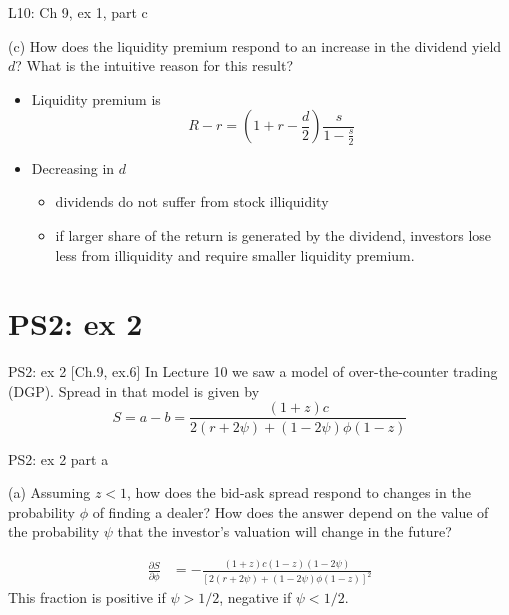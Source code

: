\documentclass[english,10pt
,aspectratio=169
]{beamer}
\begin{document}
\begin{frame}{L10: Ch 9, ex 1, part c}
	\begin{exampleblock}{}
		(c) How does the liquidity premium respond to an increase in the
		dividend yield $d$? What is the intuitive reason for this result?
	\end{exampleblock}
	
	\pause
	
	\begin{itemize}
		\item Liquidity premium is 
		\[ R-r = \left(1+r-\frac{d}{2}\right) \frac{s}{1-\frac{s}{2}} \]
		\item Decreasing in $d$
		\begin{itemize}
			\item dividends do not suffer from stock illiquidity
			\item if larger share of the return is generated by the dividend, investors lose less from illiquidity and require smaller liquidity premium.
		\end{itemize}
	\end{itemize}
\end{frame}






\section{PS2: ex 2}

\begin{frame}{PS2: ex 2 [Ch.9, ex.6]}
	In Lecture 10 we saw a model of over-the-counter trading (DGP). Spread in that model is given by
	\[
	S=a-b=\frac{(1+z)c}{2(r+2\psi)+(1-2\psi)\phi(1-z)}
	\]
\end{frame}


\begin{frame}{PS2: ex 2 part a}
	\begin{exampleblock}{}
		(a) Assuming $z<1$, how does the bid-ask spread respond to changes in the probability $\phi$ of finding a dealer? How does the answer depend on the value of the probability $\psi$ that the investor's valuation will change in the future?
	\end{exampleblock}
	
	\pause
	\begin{align*}
		\frac{\partial S}{\partial \phi} & = -\frac{(1+z)c(1-z)(1-2\psi)}{[2(r+2\psi)+(1-2\psi)\phi(1-z)]^2}
	\end{align*}
	This fraction is positive if $\psi>1/2$, negative if $\psi<1/2$.	
\end{frame}
\end{document}
